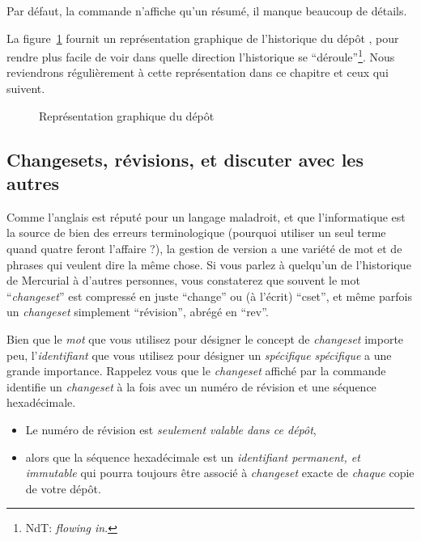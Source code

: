Par défaut, la commande  n'affiche qu'un résumé, il manque 
beaucoup de détails.


La figure~\ref{fig:tour-basic:history} fournit un représentation graphique
de l'historique du dépôt , pour rendre plus facile de voir
dans quelle direction l'historique se ``déroule''\footnote{NdT: \textit{flowing in}.}.
Nous reviendrons régulièrement à cette représentation dans ce chapitre et
ceux qui suivent.

\begin{figure}[ht]
  \centering
  \caption{Représentation graphique du dépôt  }
  \label{fig:tour-basic:history}
\end{figure}

\subsection{Changesets, révisions, et discuter avec les autres}

Comme l'anglais est réputé pour un langage maladroit, et que l'informatique
est la source de bien des erreurs terminologique (pourquoi utiliser un
seul terme quand quatre feront l'affaire ?), la gestion de version a une
variété de mot et de phrases qui veulent dire la même chose. Si vous 
parlez à quelqu'un de l'historique de Mercurial à d'autres personnes, 
vous constaterez que souvent le mot ``\textit{changeset}'' est compressé 
en juste ``change'' ou (à l'écrit) ``cset'', et même parfois un 
\textit{changeset} simplement ``révision'', abrégé en ``rev''.

Bien que le \emph{mot} que vous utilisez pour désigner le concept de
\textit{changeset} importe peu, l'\emph{identifiant} que vous utilisez
pour désigner un \emph{spécifique} \textit{spécifique} a une grande
importance. Rappelez vous que le \textit{changeset} affiché par la 
commande  identifie un \textit{changeset} à la fois avec
un numéro de révision et une séquence hexadécimale.

\begin{itemize}
\item Le numéro de révision est \emph{seulement valable dans ce dépôt},
\item alors que la séquence hexadécimale est un \emph{identifiant 
	permanent, et immutable } qui pourra toujours être associé à %
	\textit{changeset} exacte de \emph{chaque} copie de votre dépôt.
\end{itemize}

